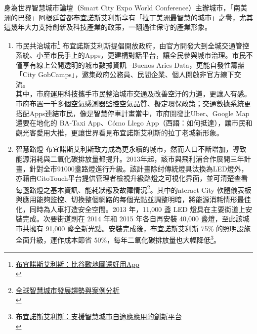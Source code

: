 \documentclass[a4paper,12pt]{article}
\begin{document}
身為世界智慧城市論壇（Smart City Expo World Conference）主辦城市，「南美洲的巴黎」阿根廷首都布宜諾斯艾利斯享有「拉丁美洲最智慧的城市」之譽，尤其這幾年大力支持創新及科技產業的政策，一翻過往保守的產業形象。\\

\begin{enumerate}
\item 市民共治城市\footnote{\href{https://futurecity.cw.com.tw/article/226}{布宜諾斯艾利斯：比谷歌地圖還好用App}\\}
\label{sec:org6d76ce9}
布宜諾斯艾利斯提倡開放政府，由官方開發大到全城交通管控系統、小至市民手上的Apps，更建構對話平台，讓全民參與城市治理。市民不僅享有線上公開透明的城市數據資訊 –Buenos Aries Data，更能自發性籌辦「City GobCamps」，邀集政府公務員、民間企業、個人開啟非官方線下交流。\\

其中，市府運用科技攜手市民整治城市交通及改善空汙的力道，更讓人有感。市府布置一千多個空氣感測器監控空氣品質、擬定環保政策；交通數據系統更搭配Apps連結市民，像是智慧停車計畫當中，市府開發比Uber、Google Map還要在地化的 BA-Taxi App、Cómo Llego App（西語：如何抵達），讓市民和觀光客愛用大推，更讓世界看見布宜諾斯艾利斯的拉丁老城新形象。\\

\item 智慧路燈
\label{sec:org171b905}
布宜諾斯艾利斯致力成為更永續的城市，然而人口不斷增加，導致能源消耗與二氧化碳排放量都提升。2013年起，該市與飛利浦合作展開三年計畫，針對全市91000盞路燈進行升級。該計畫除纣傳統燈具汰換為LED燈外，亦藉由CitoTouch平台提供管理者檢視升級路燈之可視化界面，並可清楚查看每盞路燈之基本資訊、能耗狀態及故障情況\footnote{\href{https://mic.iii.org.tw/bookstore/Book.aspx?sqno=878}{全球智慧城市發展趨勢與案例分析}\\}。其中的nteract City 軟體儀表板與應用能夠監控、切換整個網路的每個光點並調整明暗，將能源消耗情形最佳化，同時為人車打造安全空間。2013 年，11,000 盞 LED 燈具在主要街道上安裝完成。次要街道則在 2014 年和 2015 年各自再安裝 40,000 盞燈，至此該城市共擁有 91,000 盞全新光點。安裝完成後，布宜諾斯艾利斯 75\% 的照明設施全面升級，運作成本節省 50\%，每年二氧化碳排放量也大幅降低\footnote{\href{https://www.interact-lighting.com/zh-tw/case-studies/buenos-aires}{布宜諾斯艾利斯：支援智慧城市自適應應用的創新平台}\\}。\\


\end{enumerate}
\end{document}
